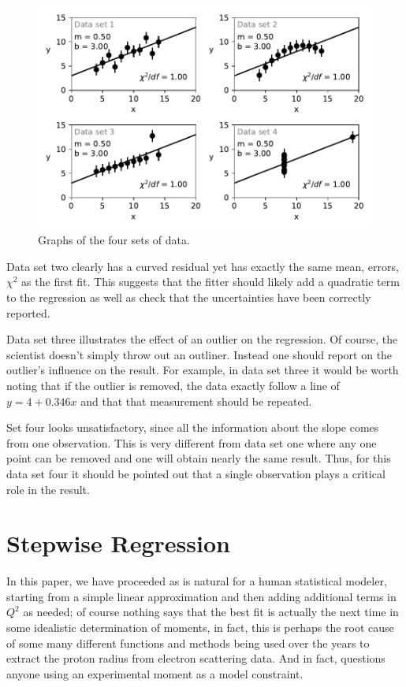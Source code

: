 \documentclass[10pt,aps,prc,twocolumn]{revtex4-1}
\begin{document}
\begin{appendix}
\begin{figure}[htb]
\includegraphics[width=\columnwidth]{Figure/SameChi2.pdf}
\caption{Graphs of the four sets of data.}
\label{SameChi2}
\end{figure}

Data set two clearly has a curved residual yet has exactly the 
same mean, errors, $\chi^2$ as the first fit.   This suggests that the fitter 
should likely add a quadratic term to the regression as well as check that
the uncertainties have been correctly reported.

Data set three illustrates the effect of an outlier on the regression.
Of course, the scientist doesn't simply throw out an outliner.
Instead one should report on the outlier's influence on the result.   For example,
in data set three it would be worth noting that if the outlier is removed, the data
exactly follow a line of $y = 4 + 0.346 x$ and that that measurement should be repeated.

Set four looks unsatisfactory, since all the information about the slope comes
from one observation.   This is very different from data set one where any one point
can be removed and one will obtain nearly the same result.   Thus, for this data set
four it should be pointed out that a single observation plays a critical role
in the result.

\section{Stepwise Regression}

In this paper, we have proceeded as is natural for a human statistical modeler, starting from a simple
linear approximation and then adding additional terms in $Q^2$ as needed; of course nothing
says that the best fit is actually the next time in some idealistic determination of moments,
in fact, this is perhaps the root cause of some many different functions and methods being used
over the years to extract the proton radius from electron scattering data.   And in fact, questions
anyone using an experimental moment as a model constraint.


\end{appendix}
\end{document}
